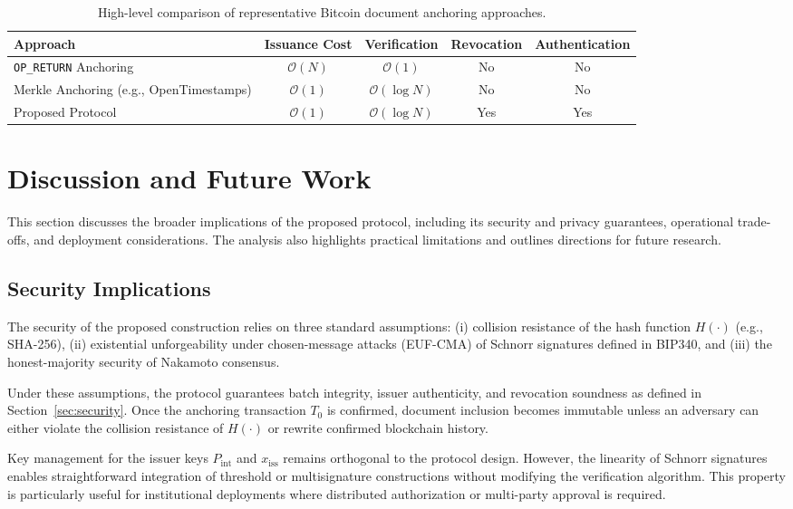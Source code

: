 \documentclass{IEEEoj}
\begin{document}
\begin{table}[!t]
\centering
\caption{High-level comparison of representative Bitcoin document anchoring approaches.}
\label{tab:approach_comparison}
\small
\renewcommand{\arraystretch}{1.15}
\begin{tabular}{lcccc}
\hline
\textbf{Approach} & \textbf{Issuance Cost} & \textbf{Verification} & \textbf{Revocation} & \textbf{Authentication} \\
\hline
\texttt{OP\_RETURN} Anchoring & $\mathcal{O}(N)$ & $\mathcal{O}(1)$ & No & No \\
Merkle Anchoring (e.g., OpenTimestamps) & $\mathcal{O}(1)$ & $\mathcal{O}(\log N)$ & No & No \\
Proposed Protocol & $\mathcal{O}(1)$ & $\mathcal{O}(\log N)$ & Yes & Yes \\
\hline
\end{tabular}
\end{table}

\section{Discussion and Future Work}
\label{sec:discussion}

This section discusses the broader implications of the proposed protocol, including its security and privacy guarantees, operational trade-offs, and deployment considerations. The analysis also highlights practical limitations and outlines directions for future research.

\subsection{Security Implications}

The security of the proposed construction relies on three standard assumptions: 
(i) collision resistance of the hash function $H(\cdot)$ (e.g., SHA-256), 
(ii) existential unforgeability under chosen-message attacks (EUF-CMA) of Schnorr signatures defined in BIP340, 
and (iii) the honest-majority security of Nakamoto consensus.

Under these assumptions, the protocol guarantees batch integrity, issuer authenticity, and revocation soundness as defined in Section~\ref{sec:security}. 
Once the anchoring transaction $T_0$ is confirmed, document inclusion becomes immutable unless an adversary can either violate the collision resistance of $H(\cdot)$ or rewrite confirmed blockchain history.

Key management for the issuer keys $P_{\mathrm{int}}$ and $x_{\mathrm{iss}}$ remains orthogonal to the protocol design. 
However, the linearity of Schnorr signatures enables straightforward integration of threshold or multisignature constructions without modifying the verification algorithm. 
This property is particularly useful for institutional deployments where distributed authorization or multi-party approval is required.
\end{document}
